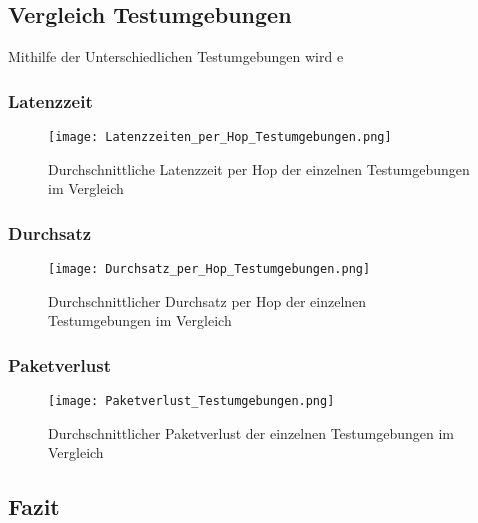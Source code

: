 \subsection{Vergleich Testumgebungen}\label{subsec:VergleichTestumgebungen}

Mithilfe der Unterschiedlichen Testumgebungen wird e



\subsubsection{Latenzzeit}\label{subsec:VergleichLatenzzeitTestumgebungen}


\begin{figure}[H]
	\centering
	\texttt{[image: Latenzzeiten\_per\_Hop\_Testumgebungen.png]}
	\caption{Durchschnittliche Latenzzeit per Hop der einzelnen Testumgebungen im Vergleich}\label{fig:Latenzzeiten_per_Hop_Testumgebungen}
\end{figure}

\subsubsection{Durchsatz}\label{subsec:VergleichDurchsatzTestumgebungen}


\begin{figure}[H]
	\centering
	\texttt{[image: Durchsatz\_per\_Hop\_Testumgebungen.png]}
	\caption{Durchschnittlicher Durchsatz per Hop der einzelnen Testumgebungen im Vergleich}\label{fig:Durchsätze_per_Hop_Testumgebungen}
\end{figure}

\subsubsection{Paketverlust}\label{subsec:VergleichPaketverlustTestumgebungen}


\begin{figure}[H]
	\centering
	\texttt{[image: Paketverlust\_Testumgebungen.png]}
	\caption{Durchschnittlicher Paketverlust der einzelnen Testumgebungen im Vergleich}\label{fig:PaketverlusteTestumgebungen}
\end{figure}



\subsection{Fazit}\label{subsec:Fazit}

